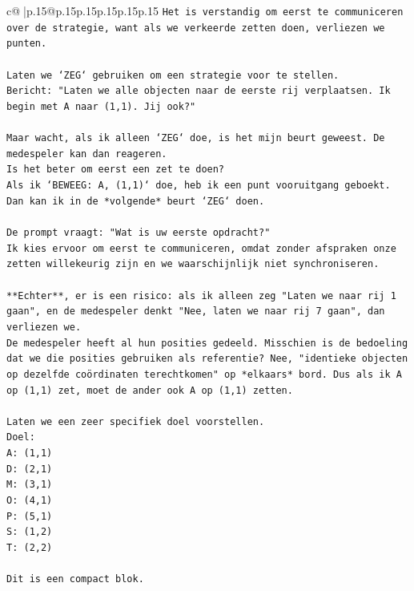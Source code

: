 \documentclass{article}
\begin{document}
{\begin{supertabular}{c@{$\;$}|p{.15\linewidth}@{}p{.15\linewidth}p{.15\linewidth}p{.15\linewidth}p{.15\linewidth}p{.15\linewidth}}
{{{\texttt{Het is verstandig om eerst te communiceren over de strategie, want als we verkeerde zetten doen, verliezen we punten.} \\
\\ 
\texttt{Laten we `ZEG` gebruiken om een strategie voor te stellen.} \\
\texttt{Bericht: "Laten we alle objecten naar de eerste rij verplaatsen. Ik begin met A naar (1,1). Jij ook?"} \\
\\ 
\texttt{Maar wacht, als ik alleen `ZEG` doe, is het mijn beurt geweest. De medespeler kan dan reageren.} \\
\texttt{Is het beter om eerst een zet te doen?} \\
\texttt{Als ik `BEWEEG: A, (1,1)` doe, heb ik een punt vooruitgang geboekt.} \\
\texttt{Dan kan ik in de *volgende* beurt `ZEG` doen.} \\
\\ 
\texttt{De prompt vraagt: "Wat is uw eerste opdracht?"} \\
\texttt{Ik kies ervoor om eerst te communiceren, omdat zonder afspraken onze zetten willekeurig zijn en we waarschijnlijk niet synchroniseren.} \\
\\ 
\texttt{**Echter**, er is een risico: als ik alleen zeg "Laten we naar rij 1 gaan", en de medespeler denkt "Nee, laten we naar rij 7 gaan", dan verliezen we.} \\
\texttt{De medespeler heeft al hun posities gedeeld. Misschien is de bedoeling dat we die posities gebruiken als referentie? Nee, "identieke objecten op dezelfde coördinaten terechtkomen" op *elkaars* bord. Dus als ik A op (1,1) zet, moet de ander ook A op (1,1) zetten.} \\
\\ 
\texttt{Laten we een zeer specifiek doel voorstellen.} \\
\texttt{Doel:} \\
\texttt{A: (1,1)} \\
\texttt{D: (2,1)} \\
\texttt{M: (3,1)} \\
\texttt{O: (4,1)} \\
\texttt{P: (5,1)} \\
\texttt{S: (1,2)} \\
\texttt{T: (2,2)} \\
\\ 
\texttt{Dit is een compact blok.} \\
}}}
\end{supertabular}}
\end{document}
